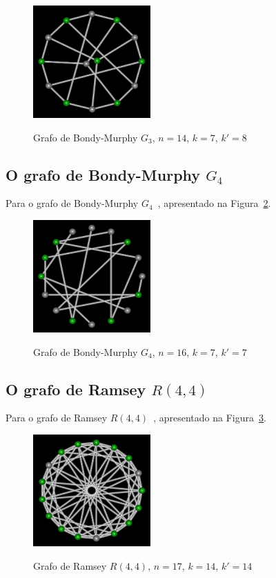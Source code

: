 \begin{figure}[htb]
\centering
\includegraphics[width=0.4\textwidth]{img/bondymurphyg3.png}
\label{fig:example-bondymurphyg3}
\caption{Grafo de Bondy-Murphy $G_3$, $n=14$, $k=7$, $k'=8$}
\end{figure}


\subsection{O grafo de Bondy-Murphy $G_4$}
Para o grafo de Bondy-Murphy $G_4$~\cite{cite:example-bondy},
apresentado na Figura~\ref{fig:example-bondymurphyg4}.

\begin{figure}[htb]
\centering
\includegraphics[width=0.4\textwidth]{img/bondymurphyg4.png}
\label{fig:example-bondymurphyg4}
\caption{Grafo de Bondy-Murphy $G_4$, $n=16$, $k=7$, $k'=7$}
\end{figure}


\subsection{O grafo de Ramsey $R(4,4)$}
Para o grafo de Ramsey $R(4,4)$~\cite{cite:example-ramsey},
apresentado na Figura~\ref{fig:example-ramsey}.

\begin{figure}[htb]
\centering
\includegraphics[width=0.4\textwidth]{img/ramsey.png}
\label{fig:example-ramsey}
\caption{Grafo de Ramsey $R(4,4)$, $n=17$, $k=14$, $k'=14$}
\end{figure}


